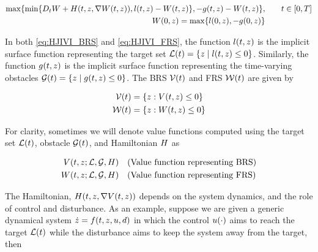 \begin{equation}
\label{eq:HJIVI_FRS}
\begin{aligned}
\max \{ \min \{D_t \valfuncfwd + \ham(t, \state, \nabla \valfuncfwd(t, \state)), \ic(t, \state) - \valfuncfwd(t, \state) \}, -\obsfunc(t, \state) - \valfuncfwd(t, \state) \}, &\qquad t \in [0, T] \\
\valfuncfwd(0, \state) = \max\{\fc(0, \state), -\obsfunc(0, \state)\}&
\end{aligned}
\end{equation}

In both \eqref{eq:HJIVI_BRS} and \eqref{eq:HJIVI_FRS}, the function  $l(t, z)$ is the implicit surface function representing the target set $\mathcal{L}(t) = \{z \mid l(t, z) \le 0\}$. Similarly, the function $g(t, z)$ is the implicit surface function representing the time-varying obstacles $\mathcal{G}(t) = \{z \mid g(t,z)\le 0\}$. The BRS $\mathcal{V}(t)$ and FRS $\mathcal{W}(t)$ are given by

\begin{equation}
\label{eq:implicitValfuncs}
\begin{aligned}
\brs(t) &= \{\state: \valfunc(t, \state) \le 0\} \\
\frs(t) &= \{\state: \valfuncfwd(t, \state) \le 0 \}
\end{aligned}
\end{equation}

 For clarity, sometimes we will denote value functions computed using the target set $\mathcal{L}(t)$, obstacle $\mathcal{G}(t)$, and Hamiltonian $H$ as 

\begin{equation}
\begin{aligned}
V(t, z; \mathcal{L}, \mathcal{G}, H) &\quad \text{(Value function representing BRS)} \\
W(t, z; \mathcal{L}, \mathcal{G}, H) &\quad \text{(Value function representing FRS)}
\end{aligned}
\end{equation}

The Hamiltonian, $H(t, z, \nabla V(t,z))$ depends on the system dynamics, and the role of control and disturbance. As an example, suppose we are given a generic dynamical system $\dot {z} = f(t, z, u, d)$ in which the control $u(\cdot)$ aims to reach the target $\mathcal{L}(t)$ while the disturbance aims to keep the system away from the target, then 

